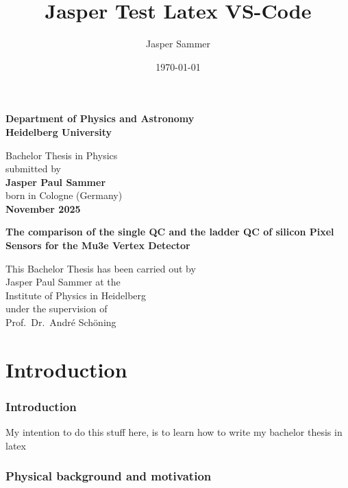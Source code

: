 \documentclass[a4paper, 12pt]{article}
\title{Jasper Test Latex VS-Code}
\author{Jasper Sammer}
\date{\today}
\begin{document}

\begin{titlepage}
\begin{center}
 
\Large\textbf{Department of Physics and Astronomy\\
Heidelberg University}

\vspace{18cm}

\normalsize
Bachelor Thesis in Physics\\
submitted by\\
\vspace{0.5cm}
\Large\textbf{Jasper Paul Sammer}\\
\normalsize
\vspace{0.5cm}
born in Cologne (Germany)\\
\vspace{0.5cm}
\Large\textbf{November 2025}
\normalsize

\newpage




\Large\textbf{The comparison of the single QC and the ladder QC of silicon Pixel Sensors for the Mu3e Vertex Detector}

\vspace{20cm}

\normalsize
This Bachelor Thesis has been carried out by\\
Jasper Paul Sammer at the\\
Institute of Physics in Heidelberg\\
under the supervision of\\
Prof.\ Dr.\ André Schöning 

\vfill
\end{center}

\end{titlepage}
\newpage
{}
\tableofcontents
\newpage
{}

\part{Introduction}
\section{Introduction}
My intention to do this stuff here, is to learn how to write my bachelor thesis in latex

\section{Physical background and motivation}
\end{document}
